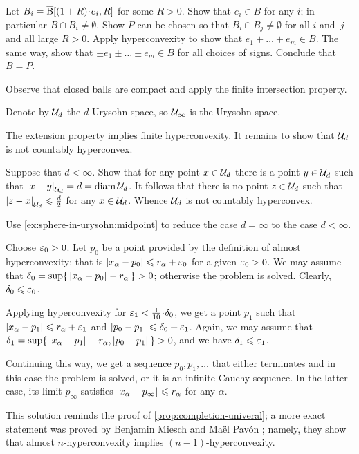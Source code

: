 Let $B_i=\cBall[(1+R)\cdot e_i,R]$ for some $R>0$.
Show that $ e_i\in B$ for any $i$; in particular $B\cap B_i\ne\emptyset$.
Show $P$ can be chosen so that $B_i\cap B_j\ne \emptyset$ for all $i$ and~$j$ and all large $R>0$.
Apply hyperconvexity to show that $e_1+\dots+ e_m\in B$.
The same way, show that $\pm e_1\pm \dots\pm e_m\in B$ for all choices of signs.
Conclude that $B=P$.

Observe that closed balls are compact and
apply the finite intersection property.

Denote by $\mathcal{U}_d$ the $d$-Urysohn space,
so $\mathcal{U}_\infty$ is the Urysohn space.

The extension property implies finite hyperconvexity.
It remains to show that $\mathcal{U}_d$ is not countably hyperconvex.

Suppose that $d<\infty$. 
Show that for any point $x\in\mathcal{U}_d$ there is a point $y\in\mathcal{U}_d$ such that $\dist{x}{y}{\spc{U}_d}=d=\diam\spc{U}_d$.
It follows that there is no point $z\in\mathcal{U}_d$ such that $\dist{z}{x}{\spc{U}_d}\le \tfrac d2$ for any $x\in\mathcal{U}_d$.
Whence $\mathcal{U}_d$ is not countably hyperconvex.

Use \ref{ex:sphere-in-urysohn:midpoint} to reduce the case $d=\infty$ to the case $d<\infty$.

Choose $\varepsilon_0>0$.
Let $p_0$ be a point provided by the definition of almost hyperconvexity;
that is $\dist{x_\alpha}{p_0}{}\le r_\alpha+\eps_0$ for a given $\varepsilon_0>0$.
We may assume that $\delta_0=\sup\{\,\dist{x_\alpha}{p_0}{}- r_\alpha\,\}>0$; otherwise the problem is solved.
Clearly, $\delta_0\leqslant \varepsilon_0$.

Applying hyperconvexity for $\eps_1<\tfrac1{10}\cdot\delta_0$,
we get a point 
$p_1$ such that $\dist{x_\alpha}{p_1}{}\le r_\alpha+\eps_1$ and $\dist{p_0}{p_1}{}\le \delta_0+\eps_1$.
Again, we may assume that $\delta_1=\sup\{\,\dist{x_\alpha}{p_1}{}- r_\alpha,\dist{p_0}{p_1}{}\,\}>0$, and we have $\delta_1\leqslant \varepsilon_1$.

Continuing this way, we get a sequence $p_0,p_1,\dots$ that either terminates and in this case the problem is solved, or it is an infinite Cauchy sequence.
In the latter case, its limit $p_\infty$ satisfies $\dist{x_\alpha}{p_\infty}{}\le r_\alpha$ for any $\alpha$.

This solution reminds the proof of \ref{prop:completion-univeral};
a more exact statement was proved by Benjamin Miesch and Maël Pavón \cite[2.2]{miesch-pavon2016};
namely, they show that almost $n$-hyperconvexity implies $(n-1)$-hyperconvexity.


